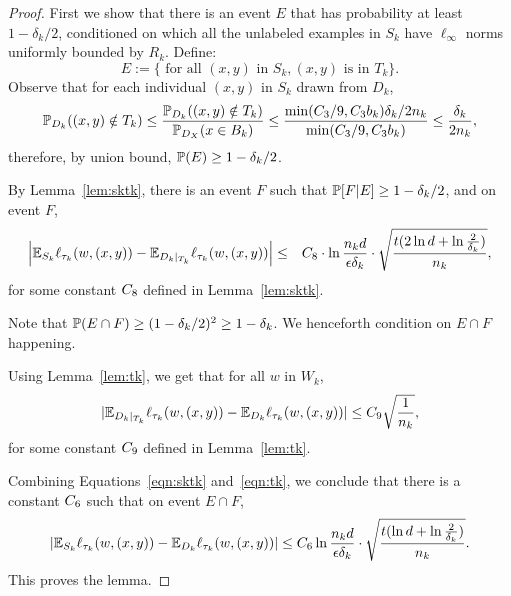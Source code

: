 \begin{proof}
First we show that there is an event $E$ that has probability at least $1-\delta_k/2$,
conditioned on which all the unlabeled examples in $S_k$ have $\ell_\infty$ norms uniformly bounded by $R_k$.
Define:
\begin{equation}
	E := \{ \text{ for all } (x,y) \text{ in } S_k, (x,y) \text{ is in } T_k \}.
	\label{eqn:e}
\end{equation}
Observe that for each individual $(x,y)$ in $S_k$ drawn from $D_k$,
\[ \P_{D_k} ((x,y) \notin T_k) \leq \frac{\P_{D_k} ((x,y) \notin T_k)}{\P_{D_X}(x \in B_k)} \leq \frac{\min(\cf /9, \cf  b_k) \delta_k / 2n_k}{\min(\cf /9, \cf  b_k)} \leq \frac{\delta_k}{2n_k}, \]
therefore, by union bound,
$\P(E) \geq 1-\delta_k/2$.

By Lemma~\ref{lem:sktk}, there is an event $F$ such that
$\P[F|E] \geq 1-\delta_k/2$, and on event $F$,
\begin{eqnarray}
\left| \E_{S_k} \ell_{\tau_k}(w, (x, y)) - \E_{D_k |_{T_k}} \ell_{\tau_k}(w, (x, y)) \right|
&\leq& \cfo  \cdot \ln\frac{n_k d}{\epsilon \delta_k} \cdot \sqrt{\frac{t(2\ln d + \ln \frac 2 {\delta_k})}{n_k}},
\label{eqn:sktk}
\end{eqnarray}
for some constant $\cfo $ defined in Lemma~\ref{lem:sktk}.

Note that $\P(E \cap F) \geq (1 - \delta_k/2)^2 \geq 1-\delta_k$. We henceforth condition on $E \cap F$ happening.

Using Lemma~\ref{lem:tk}, we get that for all $w$ in $W_k$,
\begin{equation}
|\E_{D_k|_{T_k}} \ell_{\tau_k}(w, (x, y)) - \E_{D_k} \ell_{\tau_k}(w, (x, y))| \leq C_9 \sqrt{\frac{1}{n_k}},
\label{eqn:tk}
\end{equation}
for some constant $\cn $ defined in Lemma~\ref{lem:tk}.




Combining Equations~\eqref{eqn:sktk} and~\eqref{eqn:tk}, we conclude that there is a constant $\cs $ such that on event $E \cap F$,
\[
|\E_{S_k} \ell_{\tau_k}(w, (x, y)) - \E_{D_k} \ell_{\tau_k}(w, (x, y))|
\leq \cs  \ln\frac{n_k d}{\epsilon \delta_k} \cdot \sqrt{\frac{t(\ln d + \ln \frac 2 {\delta_k})}{n_k}}.
\]
This proves the lemma.
\end{proof}

